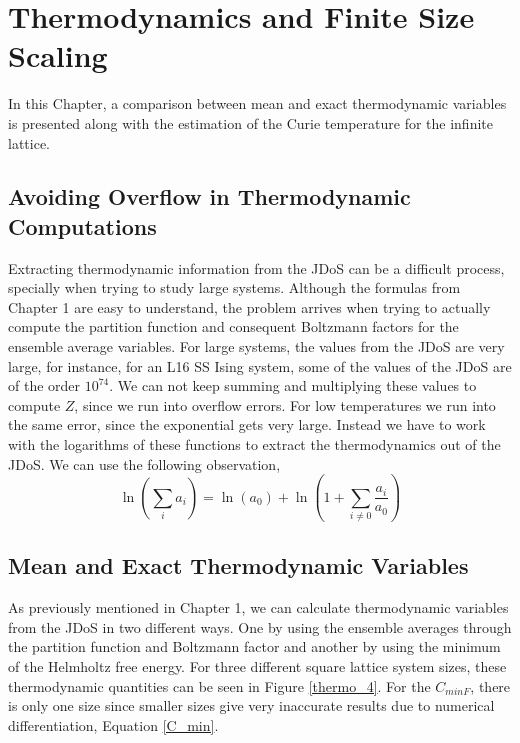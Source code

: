 \chapter{Thermodynamics and Finite Size Scaling}

	In this Chapter,  a comparison between mean and exact thermodynamic variables is presented along with the estimation of the Curie temperature for the infinite lattice.

\section{Avoiding Overflow in Thermodynamic Computations}

	Extracting thermodynamic information from the JDoS can be a difficult process, specially when trying to study large systems. Although the formulas from Chapter 1 are easy to understand, the problem arrives when trying to actually compute the partition function and consequent Boltzmann factors for the ensemble average variables. For large systems, the values from the JDoS are very large, for instance, for an L16 SS Ising system, some of the values of the JDoS are of the order $10^{74}$. We can not keep summing and multiplying these values to compute $Z$, since we run into overflow errors. For low temperatures we run into the same error, since the exponential gets very large. Instead we have to work with the logarithms of these functions to extract the thermodynamics out of the JDoS. We can use the following observation,
\begin{equation}
	\ln \left(  \sum_i a_i \right) = \ln(a_0) + \ln\left( 1 + \sum_{i \neq 0} \frac{a_i}{a_0} \right)
\end{equation}

\section{Mean and Exact Thermodynamic Variables}

	
	As previously mentioned in Chapter 1, we can calculate thermodynamic variables from the JDoS in two different ways. One by using the ensemble averages through the partition function and Boltzmann factor and another by using the minimum of the Helmholtz free energy. For three different square lattice system sizes, these thermodynamic quantities can be seen in Figure \ref{thermo_4}. For the $C_{minF}$, there is only one size since smaller sizes give very inaccurate results due to numerical differentiation, Equation \ref{C_min}.
	
